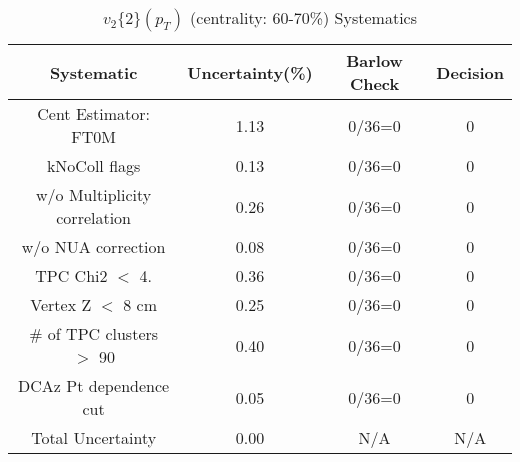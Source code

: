 \begin{table}[htbp]
\caption{$v_2\{2\}(p_{T})$ (centrality: 60-70\%) Systematics}
\label{tab:Sys_pTDiffv2}
\centering
\begin{tabular}{|c|c|c|c|}
\hline
Systematic & Uncertainty(\%) & Barlow Check & Decision \\
\hline
Cent Estimator: FT0M & 1.13 & 0/36=0 & 0 \\
kNoColl flags & 0.13 & 0/36=0 & 0 \\
w/o Multiplicity correlation & 0.26 & 0/36=0 & 0 \\
w/o NUA correction & 0.08 & 0/36=0 & 0 \\
TPC Chi2 $<$ 4. & 0.36 & 0/36=0 & 0 \\
Vertex Z $<$ 8 cm & 0.25 & 0/36=0 & 0 \\
\# of TPC clusters $>$ 90 & 0.40 & 0/36=0 & 0 \\
DCAz Pt dependence cut & 0.05 & 0/36=0 & 0 \\
\hline
Total Uncertainty & 0.00 & N/A & N/A \\
\hline
\end{tabular}
\end{table}

